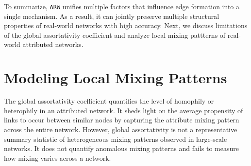 To summarize, \texttt{ARW} unifies multiple factors that influence edge formation
into a single mechanism. As a result, it can jointly preserve multiple structural
properties of real-world networks with high accuracy. Next, we discuss limitations
of the global assortativity coefficient and analyze local mixing pattterns of
real-world attributed networks.

\section{Modeling Local Mixing Patterns}
\label{subsec:LocalMixing}

The global assortativity coefficient quantifies
the level of homophily or heterophily in an attributed network. It sheds light
on the average propensity of links to occur between similar nodes by capturing
the attribute mixing pattern across the entire network.
However, global assortativity is not a representative summary statistic of heterogeneous mixing patterns
observed in large-scale networks. It does not quantify anomalous mixing patterns and
fails to measure how mixing varies across a network.

